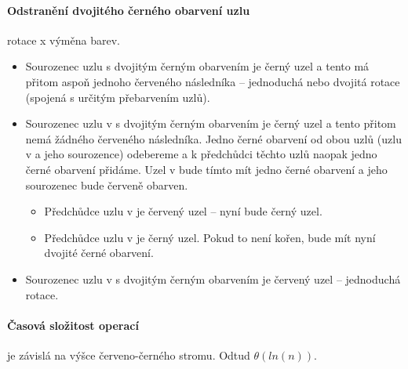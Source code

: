 \documentclass[10pt,a4paper]{article}
\begin{document}
\paragraph{Odstranění dvojitého černého obarvení uzlu}
rotace x výměna barev.
\begin{itemize}
	\item Sourozenec uzlu s dvojitým černým obarvením je černý uzel a tento má přitom aspoň jednoho červeného následníka – jednoduchá nebo dvojitá rotace (spojená s určitým přebarvením uzlů).
	\item Sourozenec uzlu v s dvojitým černým obarvením je černý uzel a tento přitom nemá žádného červeného následníka. Jedno černé obarvení od obou uzlů (uzlu v a jeho sourozence) odebereme a k předchůdci těchto uzlů naopak jedno černé obarvení přidáme. Uzel v bude tímto mít jedno černé obarvení a jeho sourozenec bude červeně obarven.
	\begin{itemize}
		\item Předchůdce uzlu v je červený uzel – nyní bude černý uzel.
		\item Předchůdce uzlu v je černý uzel. Pokud to není kořen, bude mít nyní dvojité černé obarvení.
	\end{itemize}
	\item Sourozenec uzlu v s dvojitým černým obarvením je červený uzel – jednoduchá rotace.
\end{itemize}
\paragraph{Časová složitost operací} je závislá na výšce červeno-černého stromu. Odtud $\theta(ln(n))$.
\end{document}
